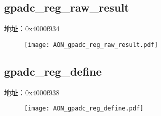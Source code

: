 \subsection{gpadc\_reg\_raw\_result}
\label{AON-gpadc-reg-raw-result}
地址：0x4000f934
\begin{figure}[H]
	\texttt{[image: AON\_gpadc\_reg\_raw\_result.pdf]}
\end{figure}

\subsection{gpadc\_reg\_define}
\label{AON-gpadc-reg-define}
地址：0x4000f938
\begin{figure}[H]
	\texttt{[image: AON\_gpadc\_reg\_define.pdf]}
\end{figure}

